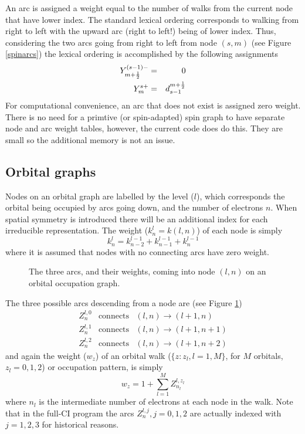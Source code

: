 An arc is assigned a weight equal to the number of walks from
the current node that have lower index.  The standard lexical ordering
corresponds to walking from right to left with the upward arc (right
to left!) being of lower index.  Thus, considering the two arcs going
from right to left from node $(s,m)$ 
(see Figure \ref{spinarcs}) the lexical ordering is
accomplished by the following assignments
\begin{eqnarray}
  Y^{(s-1)-}_{m+\frac{1}{2}} & = & 0 \nonumber \\ 
  Y^{s+}_m & = & d_{s-1}^{m+\frac{1}{2}}  \label{spinarcweights}
\end{eqnarray}
For computational convenience, an arc that does not exist is assigned
zero weight.  There is no need for a primtive (or spin-adapted) spin
graph to have separate node and arc weight tables, however, the
current code does do this.  They are small so the additional memory is
not an issue.

\subsection{Orbital graphs}

Nodes on an orbital graph are labelled by the level ($l$), which
corresponds the orbital being occupied by arcs going down, and the
number of electrons $n$.  When spatial symmetry is introduced there
will be an additional index for each irreducible representation.  The
weight ($k^l_n = k(l,n)$) of each node is simply
\begin{equation}
  k^l_n = k^{l-1}_{n-2} + k^{l-1}_{n-1} + k^{l-1}_n \label{orbnodeweight}
\end{equation}
where it is assumed that nodes with no connecting arcs have zero weight.

\begin{figure}[htbp]

\center

\centerline{}
\caption{\label{orbitalarcs} The three arcs, and their weights,
coming into node $(l,n)$ on an orbital occupation graph.}
\end{figure}

The three possible arcs descending from a node are (see Figure
\ref{orbitalarcs})
\begin{eqnarray}
 Z^{l,0}_{n} & \mbox{connects} & (l,n) \rightarrow (l+1,n) \\
 Z^{l,1}_{n} & \mbox{connects} & (l,n) \rightarrow (l+1,n+1) \\
 Z^{l,2}_{n} & \mbox{connects} & (l,n) \rightarrow (l+1,n+2)
\end{eqnarray}
and again the weight ($w_z$) of an orbital walk ($\{z: z_l,l=1,M\}$, for
$M$ orbitals, $z_l=0,1,2$) or occupation pattern, is simply
\begin{equation}
  w_z = 1 + \sum_{l=1}^{M} Z^{l,z_l}_{n_l} \label{orbwalkweight}
\end{equation}
where $n_l$ is the intermediate number of electrons at each node in
the walk.  Note that in the full-CI program the arcs $Z^{l,j}_n,
j=0,1,2$ are actually indexed with $j=1,2,3$ for historical reasons.

